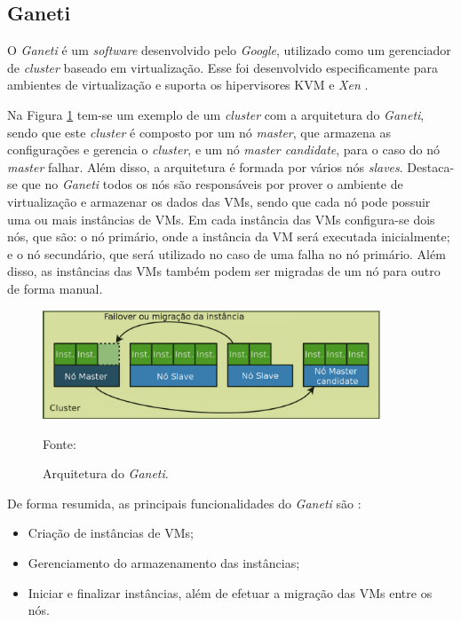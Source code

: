 \subsection{Ganeti}
\label{section:ganeti}
O \textit{Ganeti} \cite{ganeti} é um \textit{software} desenvolvido pelo \textit{Google}, utilizado como um gerenciador de \textit{cluster} 
baseado em virtualização. Esse foi desenvolvido especificamente para ambientes de virtualização e suporta os hipervisores 
\ac{KVM} \cite{kvm} e \textit{Xen} \cite{xen}. 

Na Figura \ref{fig:ganeti_arquitetura} tem-se um exemplo de um \textit{cluster} com a arquitetura do \textit{Ganeti}, sendo que este 
\textit{cluster} é composto por um nó \textit{master}, que armazena as configurações e gerencia o \textit{cluster}, e um nó 
\textit{master candidate}, para o caso do nó \textit{master} falhar. Além disso, a arquitetura é formada por vários nós \textit{slaves}. 
Destaca-se que no \textit{Ganeti} todos os nós são responsáveis por prover o ambiente de virtualização e armazenar os dados das \acp{VM}, 
sendo que cada nó pode possuir uma ou mais instâncias de \acp{VM}. Em cada instância das \acp{VM} configura-se dois nós, que são: o nó primário, 
onde a instância da \ac{VM} será executada inicialmente; e o nó secundário, que será utilizado no caso de uma falha no nó primário.
Além disso, as instâncias das \acp{VM} também podem ser migradas de um nó para outro de forma manual. 

\begin{figure}[h!]
 \centering
 \includegraphics[width=380px]{img/ganeti_arquitetura.eps}
 \caption{Arquitetura do \textit{Ganeti}.}
 Fonte: \citet{carvalho2011}
 \label{fig:ganeti_arquitetura}
\end{figure}

De forma resumida, as principais funcionalidades do \textit{Ganeti} são \cite{ganeti}:
\begin{itemize}
 \item Criação de instâncias de \acp{VM};
 \item Gerenciamento do armazenamento das instâncias;
 \item Iniciar e finalizar instâncias, além de efetuar a migração das \acp{VM} entre os nós.
\end{itemize}

